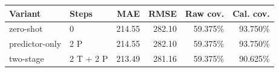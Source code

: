 \begin{tabular}{llrrrr}
\toprule
Variant & Steps & MAE & RMSE & Raw cov. & Cal. cov. \\
\midrule
zero-shot & 0 & 214.55 & 282.10 & 59.375\% & 93.750\% \\
predictor-only & 2 P & 214.55 & 282.10 & 59.375\% & 93.750\% \\
two-stage & 2 T + 2 P & 213.49 & 281.16 & 59.375\% & 90.625\% \\
\bottomrule
\end{tabular}
